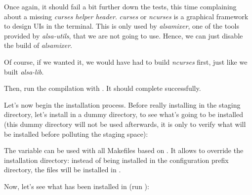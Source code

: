 Once again, it should fail a bit further down the tests, this time
complaining about a missing {\em curses helper header}. {\em curses}
or {\em ncurses} is a graphical framework to design UIs in the
terminal. This is only used by {\em alsamixer}, one of the tools
provided by {\em alsa-utils}, that we are not going to use.
Hence, we can just disable the build of {\em alsamixer}.

Of course, if we wanted it, we would have had to build {\em ncurses} first,
just like we built {\em alsa-lib}.


Then, run the compilation with . It should complete
successfully.

Let's now begin the installation process.  Before really installing in
the staging directory, let's install in a dummy directory, to see
what's going to be installed (this dummy directory will not be used
afterwards, it is only to verify what will be installed before
polluting the staging space):


The  variable can be used with all Makefiles based on
. It allows to override the installation directory:
instead of being installed in the configuration prefix directory, the
files will be installed in \code{DESTDIR/configuration-prefix}.

Now, let's see what has been installed in  (run
):

